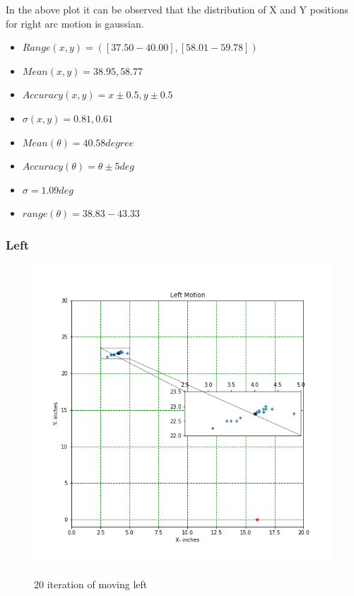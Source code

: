 \documentclass[11pt,a4paper]{article}
\begin{document}
\begin{itemize}
In the above plot it can be observed that the distribution of X and Y positions for right arc motion is gaussian.

\begin{itemize}
\item $ Range (x,y) =([37.50-40.00],[58.01-59.78])  $
\item $ Mean (x, y) = 38.95,58.77$
\item $ Accuracy (x,y) = x \pm0.5 , y \pm0.5  $ 
\item $ \sigma (x, y)= 0.81, 0.61 $
\item $ Mean(\theta) = 40.58 degree$
\item $ Accuracy (\theta)= \theta \pm5  deg $
\item $ \sigma = 1.09 deg$
\item $ range (\theta) = 38.83 - 43.33 $
\end{itemize}

\subsubsection{Left}
\begin{figure}[H]
\centering	
\includegraphics[width=1.2\linewidth]{left_i}
\label{fig:sub1}
\caption{20 iteration of moving left}
\end{figure}


\end{itemize}
\end{document}

